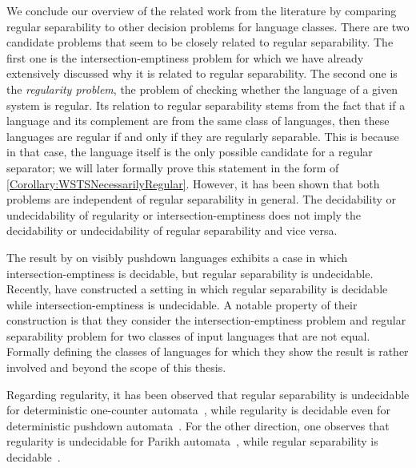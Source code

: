 \documentclass[../../diss.tex]{subfiles}
\begin{document}
We conclude our overview of the related work from the literature by comparing regular separability to other decision problems for language classes.
There are two candidate problems that seem to be closely related to regular separability.
The first one is the intersection-emptiness problem for which we have already  extensively discussed why it is related to regular separability.
The second one is the \emph{regularity problem}, the problem of checking whether the language of a given system is regular.
Its relation to regular separability stems from the fact that if a language and its complement are from the same class of languages, then these languages are regular if and only if they are regularly separable.
This is because in that case, the language itself is the only possible candidate for a regular separator; we will later formally prove this statement in the form of \cref{Corollary:WSTSNecessarilyRegular}.
However, it has been shown that both problems are independent of regular separability in general.
The decidability or undecidability of regularity or intersection-emptiness does not imply the decidability or undecidability of regular separability and vice versa.


The result by  on visibly pushdown languages exhibits a case in which intersection-emptiness is decidable, but regular separability is undecidable.
Recently,  have constructed a setting in which regular separability is decidable while intersection-emptiness is undecidable.
A notable property of their construction is that they consider the intersection-emptiness problem and regular separability problem for two classes of input languages that are not equal.
Formally defining the classes of languages for which they show the result is rather involved and beyond the scope of this thesis.

Regarding regularity, it has been observed that regular separability is undecidable for deterministic one-counter automata~\cite{CzerwinskiL17}, while regularity is decidable even for deterministic pushdown automata~\cite{Valiant75}.
For the other direction, one observes that regularity is undecidable for Parikh automata~\cite{CadilhacFM11}, while regular separability is decidable~\cite{ClementeCLP17}.
\end{document}
